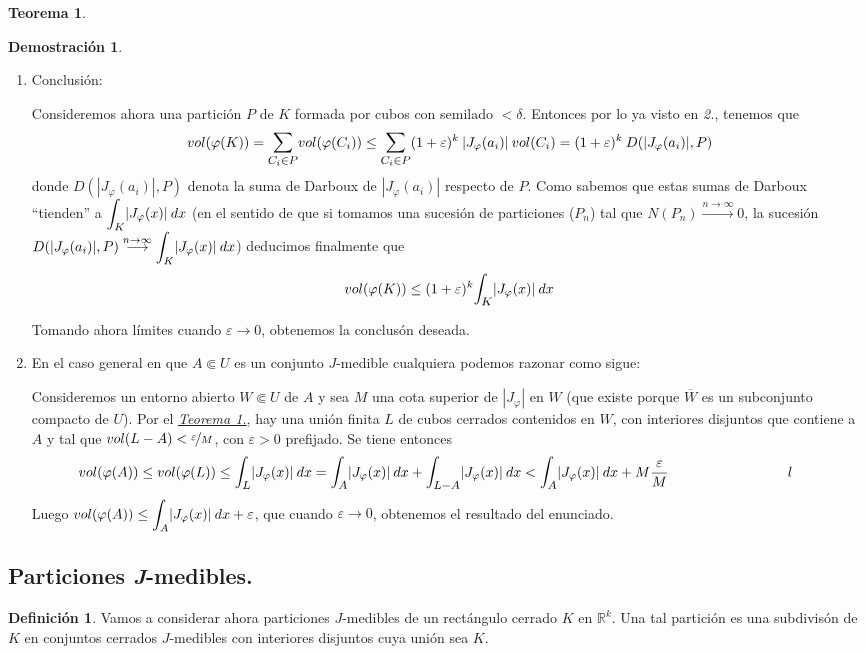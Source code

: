 \documentclass[12pt,twoside]{report}
\theoremstyle{azul}
\theoremstyle{azul2}
\theoremstyle{plain}
\theoremstyle{definition}
\newtheorem{defin}{Definición}[chapter]
\newtheorem*{dem}{Demostración}
\newtheorem*{theo}{Teorema}
\theoremstyle{remark}
\begin{document}
\begin{theo}
\begin{dem}
\begin{enumerate}
    \item Conclusión:
    
    Consideremos ahora una partición $P$ de $K$ formada por cubos con semilado $< \delta$. Entonces por lo ya visto en \textit{2.}, tenemos que 
    $$vol(\varphi(K))=\mathlarger{\sum_{C_i \in P}}vol(\varphi(C_i)) \leq \mathlarger{\sum_{C_i \in P}} (1+\varepsilon)^k \: |J_{\varphi}(a_i)| \: vol(C_i)=(1+\varepsilon)^k \: D(|J_{\varphi}(a_i)|, P)$$
    donde $D(|J_{\varphi}(a_i)|, P)$ denota la suma de Darboux de $|J_{\varphi}(a_i)|$ respecto de $P$. Como sabemos que estas sumas de Darboux ``tienden'' a   $\mathlarger{\int_K} |J_{\varphi}(x)| \: dx$ (en el sentido de que si tomamos una sucesión de particiones ($P_n$) tal que $N(P_n) \overset{n \to \infty}{\longrightarrow} 0$, la sucesión $D(|J_{\varphi}(a_i)|, P) \overset{n \to \infty}{\longrightarrow} \mathlarger{\int_K} |J_{\varphi}(x)| \: dx$) deducimos finalmente que $$vol(\varphi(K)) \leq (1+\varepsilon)^k \mathlarger{\int_K} |J_{\varphi}(x)| \: dx$$
    
    Tomando ahora límites cuando $\varepsilon \to 0$, obtenemos la conclusón deseada.
    
    \item En el caso general en que $A \Subset U$ es un conjunto $J$-medible cualquiera podemos razonar como sigue: 
    
    Consideremos un entorno abierto $W \Subset U$ de $A$ y sea $M$ una cota superior de $|J_{\varphi}|$ en $W$ (que existe porque $\overline{W}$ es un subconjunto compacto de $U$). Por el \hyperref[teo1]{\textit{Teorema 1.}}, hay una unión finita $L$ de cubos cerrados contenidos en $W$, con interiores disjuntos que contiene a $A$ y tal que $vol(L-A) < \nicefrac{\varepsilon}{M}$, con $\varepsilon > 0$ prefijado. Se tiene entonces
    $$\hspace{-7mm} vol(\varphi(A)) \leq vol(\varphi(L)) \leq \mathlarger{\int_L} |J_{\varphi}(x)| \: dx = \mathlarger{\int_A} |J_{\varphi}(x)| \: dx + \mathlarger{\int_{L-A}} |J_{\varphi}(x)| \: dx < \mathlarger{\int_A} |J_{\varphi}(x)| \: dx + M \dfrac{\varepsilon}{M} \hspace{3cm} l$$
    Luego $vol(\varphi(A)) \leq \mathlarger{\int_A} |J_{\varphi}(x)| \: dx + \varepsilon$, que cuando $\varepsilon \to 0$, obtenemos el resultado del enunciado.
\end{enumerate}
\end{dem}
\end{theo}

\subsection{Particiones \textit{J}-medibles.}
\begin{defin}
Vamos a considerar ahora particiones $J$-medibles de un rectángulo cerrado $K$ en $\mathbb{R}^k$. Una tal partición es una subdivisón de $K$ en conjuntos cerrados $J$-medibles con interiores disjuntos cuya unión sea $K$. 
\end{defin}
\end{document}
